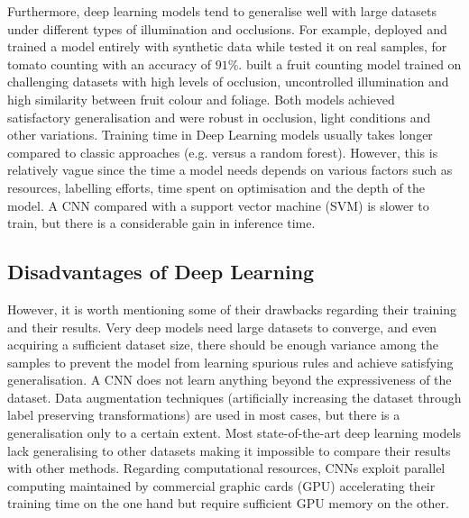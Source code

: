 Furthermore, deep learning models tend to generalise well with large datasets under different types of illumination and occlusions. For example, \cite{rahnemoonfar2017deep} deployed and trained a model entirely with synthetic data while tested it on real samples, for tomato counting with an accuracy of $91\%$. \cite{chen2017counting} built a fruit counting model trained on challenging datasets with high levels of occlusion, uncontrolled illumination and high similarity between fruit colour and foliage. Both models achieved satisfactory generalisation and were robust in occlusion, light conditions and other variations. Training time in Deep Learning models usually takes longer compared to classic approaches (e.g. versus a random forest). However, this is relatively vague since the time a model needs depends on various factors such as resources,  labelling efforts, time spent on optimisation and the depth of the model. A CNN compared with a support vector machine (SVM) is slower to train, but there is a considerable gain in inference time.

\subsection{Disadvantages of Deep Learning}
However, it is worth mentioning some of their drawbacks regarding their training and their results. Very deep models need large datasets to converge, and even acquiring a sufficient dataset size, there should be enough variance among the samples to prevent the model from learning spurious rules and achieve satisfying generalisation. A CNN does not learn anything beyond the expressiveness of the dataset. Data augmentation techniques (artificially increasing the dataset through label preserving transformations) are used in most cases, but there is a generalisation only to a certain extent. Most state-of-the-art deep learning models lack generalising to other datasets making it impossible to compare their results with other methods. Regarding computational resources, CNNs exploit parallel computing maintained by commercial graphic cards (GPU) accelerating their training time on the one hand but require sufficient GPU memory on the other.


